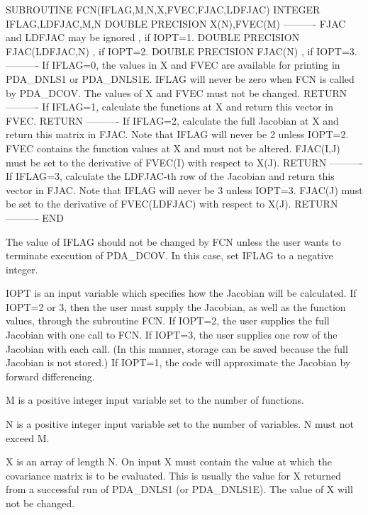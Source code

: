 \documentclass[11pt,twoside,nolof]{starlink}
\begin{document}
\begin{terminalv}
         SUBROUTINE FCN(IFLAG,M,N,X,FVEC,FJAC,LDFJAC)
         INTEGER IFLAG,LDFJAC,M,N
         DOUBLE PRECISION X(N),FVEC(M)
         ----------
         FJAC and LDFJAC may be ignored       , if IOPT=1.
         DOUBLE PRECISION FJAC(LDFJAC,N)      , if IOPT=2.
         DOUBLE PRECISION FJAC(N)             , if IOPT=3.
         ----------
           If IFLAG=0, the values in X and FVEC are available
           for printing in PDA_DNLS1 or PDA_DNLS1E.
           IFLAG will never be zero when FCN is called by PDA_DCOV.
           The values of X and FVEC must not be changed.
         RETURN
         ----------
           If IFLAG=1, calculate the functions at X and return
           this vector in FVEC.
         RETURN
         ----------
           If IFLAG=2, calculate the full Jacobian at X and return
           this matrix in FJAC.  Note that IFLAG will never be 2 unless
           IOPT=2.  FVEC contains the function values at X and must
           not be altered.  FJAC(I,J) must be set to the derivative
           of FVEC(I) with respect to X(J).
         RETURN
         ----------
           If IFLAG=3, calculate the LDFJAC-th row of the Jacobian
           and return this vector in FJAC.  Note that IFLAG will
           never be 3 unless IOPT=3.  FJAC(J) must be set to
           the derivative of FVEC(LDFJAC) with respect to X(J).
         RETURN
         ----------
         END


         The value of IFLAG should not be changed by FCN unless the
         user wants to terminate execution of PDA_DCOV.  In this case, set
         IFLAG to a negative integer.


       IOPT is an input variable which specifies how the Jacobian will
         be calculated.  If IOPT=2 or 3, then the user must supply the
         Jacobian, as well as the function values, through the
         subroutine FCN.  If IOPT=2, the user supplies the full
         Jacobian with one call to FCN.  If IOPT=3, the user supplies
         one row of the Jacobian with each call.  (In this manner,
         storage can be saved because the full Jacobian is not stored.)
         If IOPT=1, the code will approximate the Jacobian by forward
         differencing.

       M is a positive integer input variable set to the number of
         functions.

       N is a positive integer input variable set to the number of
         variables.  N must not exceed M.

       X is an array of length N.  On input X must contain the value
         at which the covariance matrix is to be evaluated.  This is
         usually the value for X returned from a successful run of
         PDA_DNLS1 (or PDA_DNLS1E).  The value of X will not be changed.


\end{terminalv}
\end{document}
